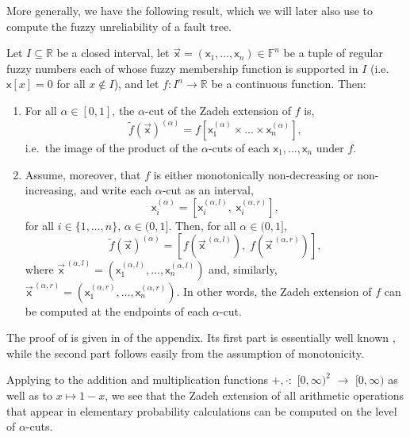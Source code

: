 \documentclass[runningheads]{llncs}
\newcommand{\fuzznum}{\mathbb{F}} %
\begin{document}
More generally, we have the following result, which we will later also use to compute the fuzzy unreliability of a fault tree.

\begin{lemma}\label{lemma:zadeh-extension-via-alpha-cuts}
    Let $I\subseteq \mathbb{R}$ be a closed interval, 
    let $\vec{\mathsf{x}}=(\mathsf{x}_1 , \dots, \mathsf{x}_n)\in \fuzznum^n$ be a tuple of regular fuzzy numbers each of whose fuzzy membership function is supported in $I$ (i.e. $\mathsf{x}[x]=0$ for all $x\not\in I$), 
    and let $f: I^n \to \mathbb{R}$ be a continuous function.
    Then:
    \begin{enumerate}
        \item For all $\alpha\in [0,1]$, the $\alpha$-cut of the Zadeh extension of $f$ is, 
        $$ 
        \widetilde{f}(\vec{\mathsf{x}})^{(\alpha)}
        = f\left[\mathsf{x}_1^{(\alpha)} \times \dots \times \mathsf{x}_n^{(\alpha)}\right],
        $$
        i.e.~the image of the product of the $\alpha$-cuts of each $\mathsf{x}_1 , \dots, \mathsf{x}_n$ under $f$.
        \item Assume, moreover, that $f$ is either monotonically non-decreasing or non-increasing, and write each $\alpha$-cut as an interval,
        $$
        \mathsf{x}_{i}^{(\alpha)} = 
        \left[\mathsf{x}_{i}^{(\alpha, l)}, \;\mathsf{x}_{i}^{(\alpha, r)}\right], 
        $$
        for all $i\in\{1,\dots, n\}, \,\alpha\in (0, 1]$. Then, for all $\alpha\in (0,1]$,
        $$
        \widetilde{f}(\vec{\mathsf{x}})^{(\alpha)}
        = \left[f\left(\vec{\mathsf{x}}^{\,(\alpha, l)}\right),
        \;f\left(\vec{\mathsf{x}}^{\,(\alpha, r)}\right)\right],
        $$ 
        where $\vec{\mathsf{x}}^{\,(\alpha, l)} = (\mathsf{x}_1^{(\alpha, l)} , \dots, \mathsf{x}_n^{(\alpha, l)})$
        and, similarly, $\vec{\mathsf{x}}^{\,(\alpha, r)} = (\mathsf{x}_1^{(\alpha, r)} , \dots, \mathsf{x}_n^{(\alpha, r)})$. In other words, the Zadeh extension of $f$ can be computed at the endpoints of each $\alpha$-cut.
    \end{enumerate}
\end{lemma}

The proof of  is given in  of the appendix. Its first part is essentially well known \cite[Proposition 5.1]{nguyen1978note}, while the second part follows easily from the assumption of monotonicity. 

Applying  to the addition and multiplication functions $+,\cdot:$ $[0,\infty)^2$ $\to$ $[0,\infty)$ as well as to $x \mapsto 1-x$, we see that the Zadeh extension of all arithmetic operations that appear in elementary probability calculations can be computed on the level of $\alpha$-cuts. 
\end{document}
